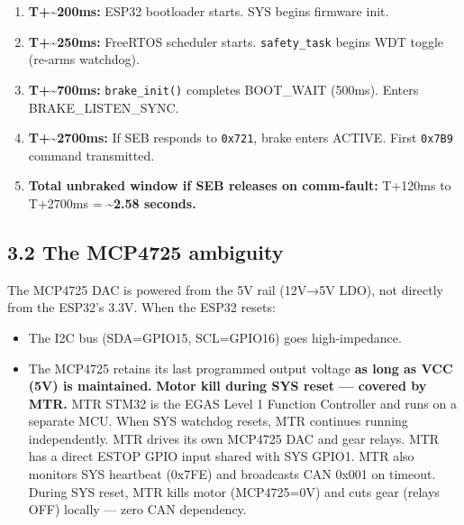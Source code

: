 \documentclass[12pt,a4paper,oneside]{report}
\providecommand{\tightlist}{\setlength{\itemsep}{0pt}\setlength{\parskip}{0pt}}
\begin{document}
\begin{enumerate}
  \begin{itemize}
  \tightlist
  \item
    \textbf{Hold} last commanded pressure/stroke → brake maintained.
    \textbf{Safe.}
  \item
    \textbf{Release} pressure → brake lost. \textbf{Unsafe.}
  \item
    \textbf{Ramp release} over N seconds → partial brake during window.
    \textbf{Partially safe.}
  \end{itemize}
\item
  \textbf{T+\textasciitilde200ms:} ESP32 bootloader starts. SYS begins firmware
  init.
\item
  \textbf{T+\textasciitilde250ms:} FreeRTOS scheduler starts.
  \texttt{safety\_task} begins WDT toggle (re-arms watchdog).
\item
  \textbf{T+\textasciitilde700ms:} \texttt{brake\_init()} completes BOOT\_WAIT
  (500ms). Enters BRAKE\_LISTEN\_SYNC.
\item
  \textbf{T+\textasciitilde2700ms:} If SEB responds to \texttt{0x721}, brake
  enters ACTIVE. First \texttt{0x7B9} command transmitted.
\item
  \textbf{Total unbraked window if SEB releases on comm-fault:} T+120ms to
  T+2700ms = \textbf{\textasciitilde2.58 seconds.}
\end{enumerate}

\subsection{3.2 The MCP4725 ambiguity}\label{the-mcp4725-ambiguity}

The MCP4725 DAC is powered from the 5V rail (12V→5V LDO), not directly from the
ESP32's 3.3V. When the ESP32 resets:

\begin{itemize}
\tightlist
\item
  The I2C bus (SDA=GPIO15, SCL=GPIO16) goes high-impedance.
\item
  The MCP4725 retains its last programmed output voltage \textbf{as long as VCC
  (5V) is maintained.} \textbf{Motor kill during SYS reset --- covered by MTR.}
  MTR STM32 is the EGAS Level 1 Function Controller and runs on a separate MCU.
  When SYS watchdog resets, MTR continues running independently. MTR drives its
  own MCP4725 DAC and gear relays. MTR has a direct ESTOP GPIO input shared with
  SYS GPIO1. MTR also monitors SYS heartbeat (0x7FE) and broadcasts CAN 0x001 on
  timeout. During SYS reset, MTR kills motor (MCP4725=0V) and cuts gear (relays
  OFF) locally --- zero CAN dependency.
\end{itemize}
\end{document}
